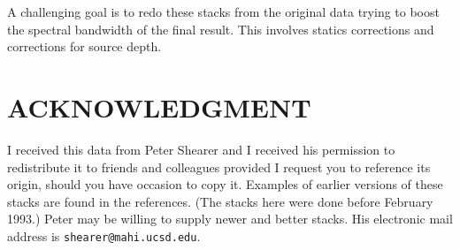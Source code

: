 A challenging goal is to redo these stacks from the original data
trying to boost the spectral bandwidth of the final result.
This involves statics corrections and corrections for source depth.


\section{ACKNOWLEDGMENT}
I received this data from Peter Shearer
and I received his permission to redistribute it to friends and colleagues
provided I request you to reference its origin,
should you have occasion to copy it.
Examples of earlier versions of these stacks are found in the references.
(The stacks here were done before February 1993.)
Peter may be willing to supply newer and better stacks.
His electronic mail address is {\tt shearer@mahi.ucsd.edu}.

\nocite{shearer1}
\nocite{shearer2}




